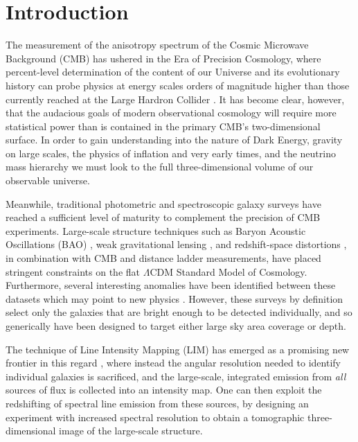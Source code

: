 \chapter{\label{chap:intro} Introduction}

The measurement of the anisotropy spectrum of the Cosmic Microwave Background (CMB) has ushered in the Era of Precision Cosmology, where percent-level determination of the content of our Universe and its evolutionary history can probe physics at energy scales orders of magnitude higher than those currently reached at the Large Hardron Collider \citep{planckcosmo, planckxbicep}. It has become clear, however, that the audacious goals of modern observational cosmology will require more statistical power than is contained in the primary CMB's two-dimensional surface. In order to gain understanding into the nature of Dark Energy, gravity on large scales, the physics of inflation and very early times, and the neutrino mass hierarchy we must look to the full three-dimensional volume of our observable universe. 

Meanwhile, traditional photometric and spectroscopic galaxy surveys have reached a sufficient level of maturity to complement the precision of CMB experiments. Large-scale structure techniques such as Baryon Acoustic Oscillations (BAO) \citep{boss}, weak gravitational lensing \citep{cfhtlens, kids450}, and redshift-space distortions \citep{rsd}, in combination with CMB and distance ladder measurements, have placed stringent constraints on the flat $\Lambda$CDM Standard Model of Cosmology. Furthermore, several interesting anomalies have been identified between these datasets which may point to new physics \citep{planckcosmo, h0}. However, these surveys by definition select only the galaxies that are bright enough to be detected individually, and so generically have been designed to target either large sky area coverage or depth.

The technique of Line Intensity Mapping (LIM) has emerged as a promising new frontier in this regard \citep{statusreport}, where instead the angular resolution needed to identify individual galaxies is sacrificed, and the large-scale, integrated emission from \textit{all} sources of flux is collected into an intensity map. One can then exploit the redshifting of spectral line emission from these sources, by designing an experiment with increased spectral resolution to obtain a tomographic three-dimensional image of the large-scale structure.

